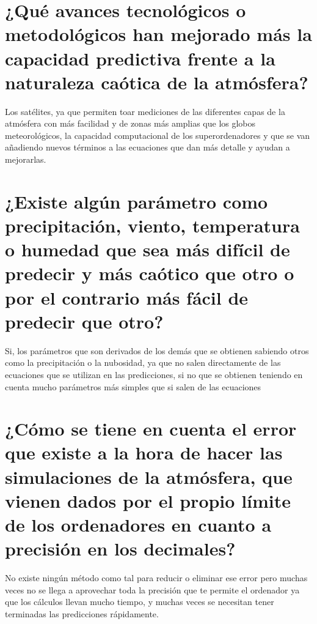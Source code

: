 \documentclass[
  10pt,
  a4paper,
  DIV=11,
  numbers=noendperiod,
  open=any]{scrreprt}
\numberwithin{equation}{chapter}
\numberwithin{equation}{section}
\renewcommand{\[}{\begin{equation}}
\renewcommand{\]}{\end{equation}}
\begin{document}
\section{¿Qué avances tecnológicos o metodológicos han mejorado más la
capacidad predictiva frente a la naturaleza caótica de la
atmósfera?}\label{quuxe9-avances-tecnoluxf3gicos-o-metodoluxf3gicos-han-mejorado-muxe1s-la-capacidad-predictiva-frente-a-la-naturaleza-cauxf3tica-de-la-atmuxf3sfera}

Los satélites, ya que permiten toar mediciones de las diferentes capas
de la atmósfera con más facilidad y de zonas más amplias que los globos
meteorológicos, la capacidad computacional de los superordenadores y que
se van añadiendo nuevos términos a las ecuaciones que dan más detalle y
ayudan a mejorarlas.

\section{¿Existe algún parámetro como precipitación, viento, temperatura
o humedad que sea más difícil de predecir y más caótico que otro o por
el contrario más fácil de predecir que
otro?}\label{existe-alguxfan-paruxe1metro-como-precipitaciuxf3n-viento-temperatura-o-humedad-que-sea-muxe1s-difuxedcil-de-predecir-y-muxe1s-cauxf3tico-que-otro-o-por-el-contrario-muxe1s-fuxe1cil-de-predecir-que-otro}

Si, los parámetros que son derivados de los demás que se obtienen
sabiendo otros como la precipitación o la nubosidad, ya que no salen
directamente de las ecuaciones que se utilizan en las predicciones, si
no que se obtienen teniendo en cuenta mucho parámetros más simples que
si salen de las ecuaciones

\section{¿Cómo se tiene en cuenta el error que existe a la hora de hacer
las simulaciones de la atmósfera, que vienen dados por el propio límite
de los ordenadores en cuanto a precisión en los
decimales?}\label{cuxf3mo-se-tiene-en-cuenta-el-error-que-existe-a-la-hora-de-hacer-las-simulaciones-de-la-atmuxf3sfera-que-vienen-dados-por-el-propio-luxedmite-de-los-ordenadores-en-cuanto-a-precisiuxf3n-en-los-decimales}

No existe ningún método como tal para reducir o eliminar ese error pero
muchas veces no se llega a aprovechar toda la precisión que te permite
el ordenador ya que los cálculos llevan mucho tiempo, y muchas veces se
necesitan tener terminadas las predicciones rápidamente.
\end{document}
